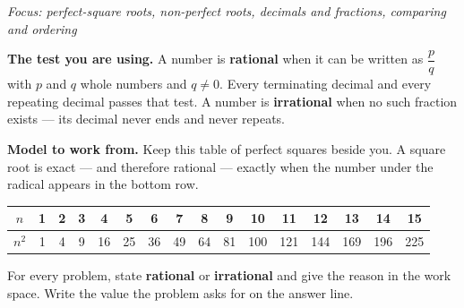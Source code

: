 \documentclass[12pt]{article}
\begin{document}

\begin{center}
\textit{Focus: perfect-square roots, non-perfect roots, decimals and fractions,
comparing and ordering}
\end{center}

\noindent\textbf{The test you are using.} A number is \textbf{rational} when it
can be written as $\dfrac{p}{q}$ with $p$ and $q$ whole numbers and $q \neq 0$.
Every terminating decimal and every repeating decimal passes that test. A number
is \textbf{irrational} when no such fraction exists --- its decimal never ends
and never repeats.

\smallskip
\noindent\textbf{Model to work from.} Keep this table of perfect squares beside
you. A square root is exact --- and therefore rational --- exactly when the
number under the radical appears in the bottom row.

\begin{center}\small
\begin{tabular}{|c|c|c|c|c|c|c|c|c|c|c|c|c|c|c|c|}
\hline
$n$ & 1 & 2 & 3 & 4 & 5 & 6 & 7 & 8 & 9 & 10 & 11 & 12 & 13 & 14 & 15 \\ \hline
$n^2$ & 1 & 4 & 9 & 16 & 25 & 36 & 49 & 64 & 81 & 100 & 121 & 144 & 169 & 196 & 225 \\ \hline
\end{tabular}
\end{center}

\smallskip
\noindent For every problem, state \textbf{rational} or \textbf{irrational} and
give the reason in the work space. Write the value the problem asks for on the
answer line.


\end{document}
